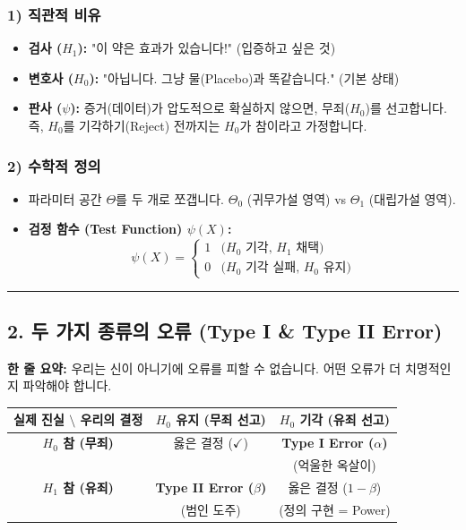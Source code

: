 \documentclass[11pt,a4paper]{book}
\theoremstyle{definition}
\begin{document}
\subsubsection*{1) 직관적 비유}
\begin{itemize}
    \item \textbf{검사 ($H_1$):} "이 약은 효과가 있습니다!" (입증하고 싶은 것)
    \item \textbf{변호사 ($H_0$):} "아닙니다. 그냥 물(Placebo)과 똑같습니다." (기본 상태)
    \item \textbf{판사 ($\psi$):} 증거(데이터)가 압도적으로 확실하지 않으면, 무죄($H_0$)를 선고합니다. 즉, $H_0$를 기각하기(Reject) 전까지는 $H_0$가 참이라고 가정합니다.
\end{itemize}

\subsubsection*{2) 수학적 정의}
\begin{itemize}
    \item 파라미터 공간 $\Theta$를 두 개로 쪼갭니다. $\Theta_0$ (귀무가설 영역) vs $\Theta_1$ (대립가설 영역).
    \item \textbf{검정 함수 (Test Function) $\psi(X)$:}
    $$ \psi(X) = \begin{cases} 1 & \text{($H_0$ 기각, $H_1$ 채택)} \\ 0 & \text{($H_0$ 기각 실패, $H_0$ 유지)} \end{cases} $$
\end{itemize}

\vspace{0.5cm}\hrule\vspace{0.5cm}

\subsection{2. 두 가지 종류의 오류 (Type I \& Type II Error)}


\begin{conceptbox}[title={개념 2: 억울한 누명 vs 범인 놓침}]
\textbf{한 줄 요약:} 우리는 신이 아니기에 오류를 피할 수 없습니다. 어떤 오류가 더 치명적인지 파악해야 합니다.
\end{conceptbox}

\begin{table}[h]
\centering
\begin{tabular}{c|c|c}
\toprule
\textbf{실제 진실 $\setminus$ 우리의 결정} & \textbf{$H_0$ 유지 (무죄 선고)} & \textbf{$H_0$ 기각 (유죄 선고)} \\
\midrule
\textbf{$H_0$ 참 (무죄)} & 옳은 결정 ($\checkmark$) & \textbf{Type I Error ($\alpha$)} \\
& & (억울한 옥살이) \\
\hline
\textbf{$H_1$ 참 (유죄)} & \textbf{Type II Error ($\beta$)} & 옳은 결정 ($1-\beta$) \\
& (범인 도주) & (정의 구현 = Power) \\
\bottomrule
\end{tabular}
\end{table}
\end{document}
